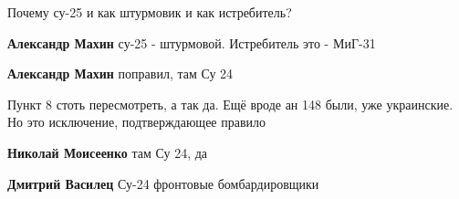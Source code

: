 \begin{itemize}

Почему су-25 и как штурмовик и как истребитель?

\begin{itemize}

 
\textbf{Александр Махин} су-25 - штурмовой. Истребитель это - МиГ-31

 
\textbf{Александр Махин} поправил, там Су 24
\end{itemize}

\par
 

Пункт 8 стоть пересмотреть, а так да. Ещё вроде ан 148 были, уже украинские. Но
это исключение, подтверждающее правило

\begin{itemize}
 
\textbf{Николай Моисеенко} там Су 24, да

 
\textbf{Дмитрий Василец} Су-24 фронтовые бомбардировщики
\end{itemize}

 

\end{itemize}
